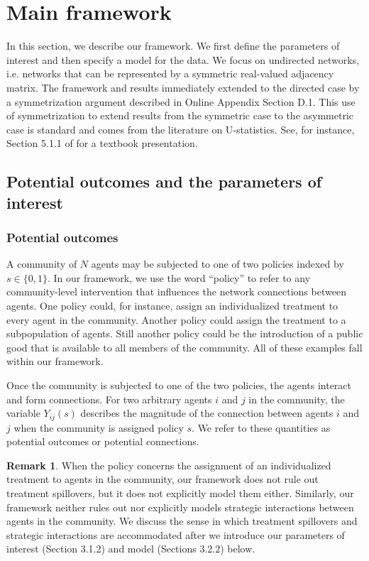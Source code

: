 \documentclass[12pt]{article}
\theoremstyle{definition}
\newtheorem{remark}{Remark}
\begin{document}
  
\section{Main framework}
In this section, we describe our framework. We first define the parameters of interest and then specify a model for the data. We focus on undirected networks, i.e. networks that can be represented by a symmetric real-valued adjacency matrix. The framework and results immediately extended to the directed case by a symmetrization argument described in Online Appendix Section D.1. This use of symmetrization to extend results from the symmetric case to the asymmetric case is standard and comes from the literature on U-statistics. See, for instance, Section 5.1.1 of \cite{serfling2009approximation} for a textbook presentation.   

\subsection{Potential outcomes and the parameters of interest}
\subsubsection{Potential outcomes}
A community of $N$ agents may be subjected to one of two policies indexed by $s \in \{0,1\}$. In our framework, we use the word ``policy'' to refer to any community-level intervention that influences the network connections between agents. One policy could, for instance, assign an individualized treatment to every agent in the community. Another policy could assign the treatment to a subpopulation of agents. Still another policy could be the introduction of a public good that is available to all members of the community. All of these examples fall within our framework.   

Once the community is subjected to one of the two policies, the agents interact and form connections. For two arbitrary agents $i$ and $j$ in the community, the variable $Y_{ij}(s)$ describes the magnitude of the connection between agents $i$ and $j$ when the community is assigned policy $s$. We refer to these quantities as potential outcomes or potential connections.  

\begin{remark}
When the policy concerns the assignment of an individualized treatment to agents in the community, our framework does not rule out treatment spillovers, but it does not explicitly model them either. Similarly, our framework neither rules out nor explicitly models strategic interactions between agents in the community. We discuss the sense in which treatment spillovers and strategic interactions are accommodated after we introduce our parameters of interest (Section 3.1.2) and model (Sections 3.2.2) below. 
\end{remark}
\end{document}
